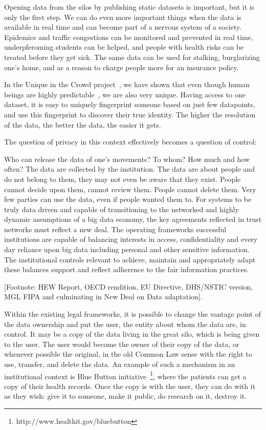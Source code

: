 Opening data from the silos by publishing static datasets is important, but it is only the first step.
We can do even more important things when the data is available in real time and can become part of a nervous system of a society.
Epidemics and traffic congestions can be monitored and prevented in real time, underpferoming students can be helped, and people with health risks can be treated before they get sick. The same data can be used for stalking, burglarizing one's home, and as a reason to charge people more for an insurance policy.

In the Unique in the Crowd project~\cite{de2013unique}, we have shown that even though human beings are highly predictable~\cite{song2010limits}, we are also very unique.
Having access to one dataset, it is easy to uniquely fingerprint someone based on just few datapoints, and use this fingerprint to discover their true identity.
The higher the resolution of the data, the better the data, the easier it gets.

The question of privacy in this context effectively becomes a question of control:

Who can release the data of one's movements?
To whom?
How much and how often?
The data are collected by the institution.
The data are about people and do not belong to them, they may not even be aware that they exist.
People cannot decide upon them, cannot review them.
People cannot delete them.
Very few parties can use the data, even if people wanted them to.
For systems to be truly data driven and capable of transitioning to the networked and highly dynamic assumptions of a big data economy, the key agreements reflected in trust networks must reflect a new deal.
The operating frameworks successful institutions are capable of balancing interests in access, confidentiality and every day reliance upon big data including personal and other sensitive information.
The institutional controls relevant to achieve, maintain and appropriately adapt these balances support and reflect adherence to the fair information practices.

[Footnote: HEW Report, OECD rendition, EU Directive, DHS/NSTIC version, MGL FIPA and culminating in New Deal on Data adaptation].

Within the existing legal frameworks, it is possible to change the vantage point of the data ownership and put the user, the entity about whom the data are, in control.
It may be a copy of the data living in the great silo, which is being given to the user.
The user would become the owner of their copy of the data, or whenever possible the original, in the old Common Law sense with the right to use, transfer, and delete the data.
An example of such a mechanism in an institutional context is Blue Button initiative~\footnote{http://www.healthit.gov/bluebutton}, where the patients can get a copy of their health records. 
Once the copy is with the user, they can do with it as they wish: give it to someone, make it public, do research on it, destroy it.

